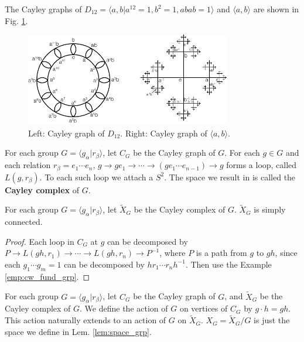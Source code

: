 \documentclass[12pt]{book}
\begin{document}
\begin{example}
	The Cayley graphs of $D_{12}=\langle a,b|a^{12}=1,b^2=1,abab=1\rangle$ and $\langle a,b\rangle$ are shown in Fig. \ref{fig:cayley_grp}.
\end{example}

\begin{figure}[htb!]
	\centering  
	\includegraphics[width=0.8\textwidth ]{resources/chap_fund_grp/cayley_grph.pdf}  
	\caption{Left: Cayley graph of $D_{12}$. Right: Cayley graph of $\langle a,b\rangle$.}
	\label{fig:cayley_grp}
\end{figure}

\begin{definition}
	For each group $G=\langle g_\alpha|r_\beta\rangle$, let $C_G$ be the Cayley graph of $G$. For each $g\in G$ and each relation $r_\beta=e_1\cdots e_n$, $g\rightarrow ge_1\rightarrow\cdots\rightarrow(ge_1\cdots e_{n-1})\rightarrow g$ forms a loop, called $L(g,r_\beta)$. To each such loop we attach a $S^2$. The space we result in is called the {\bf Cayley complex} of $G$. 
\end{definition}

\begin{lemma}
	For each group $G=\langle g_\alpha|r_\beta\rangle$, let $\tilde X_G$ be the Cayley complex of $G$. $\tilde X_G$ is simply connected.
\end{lemma}
\begin{proof}
	Each loop in $C_G$ at $g$ can be decomposed by $P\rightarrow L(gh,r_1)\rightarrow\cdots\rightarrow L(gh,r_n)\rightarrow P^{-1}$, where $P$ is a path from $g$ to $gh$, since each $g_1\cdots g_m=1$ can be decomposed by $hr_1\cdots r_nh^{-1}$. Then use the Example \ref{emp:cw_fund_grp}.
\end{proof}

\begin{lemma}
	For each group $G=\langle g_\alpha|r_\beta\rangle$, let $C_G$ be the Cayley graph of $G$, and $\tilde X_G$ be the Cayley complex of $G$. We define the action of $G$ on vertices of $C_G$ by $g\cdot h=gh$. This action naturally extends to an action of $G$ on $\tilde X_G$. $X_G=\tilde X_G/G$ is just the space we define in Lem. \ref{lem:space_grp}.
\end{lemma}
\end{document}
